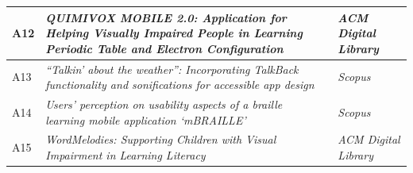\begin{quadro}[htb!]
\begin{tabular}{|m{0.8cm} | m{8.2cm} | m{2.7cm} | m{2.5cm}|}
    A12 & \emph{QUIMIVOX MOBILE 2.0: Application for Helping Visually Impaired People in Learning Periodic Table and Electron Configuration} & \cite{Oliveira2019} & \emph{ACM Digital Library} \\ \hline
    A13 & \emph{``Talkin' about the weather'': Incorporating TalkBack functionality and sonifications for accessible app design} & \cite{Tomlinson2016377} & \emph{Scopus} \\ \hline
    A14 & \emph{Users’ perception on usability aspects of a braille learning mobile application ‘mBRAILLE’} & \cite{Nahar2019100} & \emph{Scopus} \\ \hline
    A15 & \emph{WordMelodies: Supporting Children with Visual Impairment in Learning Literacy} & \cite{Mascetti2019} & \emph{ACM Digital Library} \\ \hline
\end{tabular}
\end{quadro}